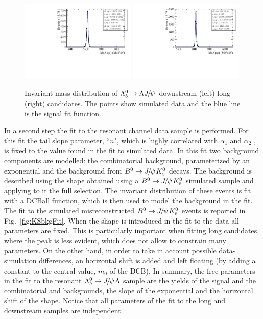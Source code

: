 \begin{figure}
\centering
\includegraphics[width=0.49\textwidth]{Lmumu/figs/MassFits/fitLb2JpsiL_DD_MC.pdf}
\includegraphics[width=0.49\textwidth]{Lmumu/figs/MassFits/fitLb2JpsiL_LL_MC.pdf}
\caption{Invariant mass distribution of $\Lb\ra\Lz\jpsi$ downstream (left) long (right) candidates.
The points show simulated data and the blue line is the signal fit function.}
\label{fig:Lb_jpsiMCfit}
\end{figure}

In a second step the fit to the resonant channel data sample is performed.
For this fit the tail slope parameter, ``$n$", which is highly correlated
with $\alpha_1$ and $\alpha_2$ , is fixed to the value found in the fit to simulated data.
In this fit two background components are modelled: the combinatorial background,
parameterized by an exponential and the background from $\Bz\ra\jpsi\KS$ decays.
The \KS background is described using the shape obtained using a $\Bz\ra\jpsi\KS$ simulated
sample and applying to it the full selection. The invariant distribution of these events
is fit with a DCBall function, which is then used to model the \KS background
in the \Lb\to\jpsi\Lz fit. The fit to the simulated misreconstructed $\Bz\ra\jpsi\KS$ events
is reported in Fig.~\ref{fig:KSbkgFit}. When the \KS shape is introduced in the fit to the data all
parameters are fixed. This is particularly important when fitting long candidates, where the \KS
peak is less evident, which does not allow to constrain many parameters. On the other hand, in order
to take in account possible data-simulation differences, an horizontal shift is added and left
floating (by adding a constant to the central value, $m_0$ of the DCB).
In summary, the free parameters in the fit to the resonant $\Lb\to\jpsi\Lz$ sample
are the yields of the signal and the combinatorial and \KS backgrounds, the slope
of the exponential and the horizontal shift of the \KS shape. Notice that all parameters
of the fit to the long and downstream samples are independent.

